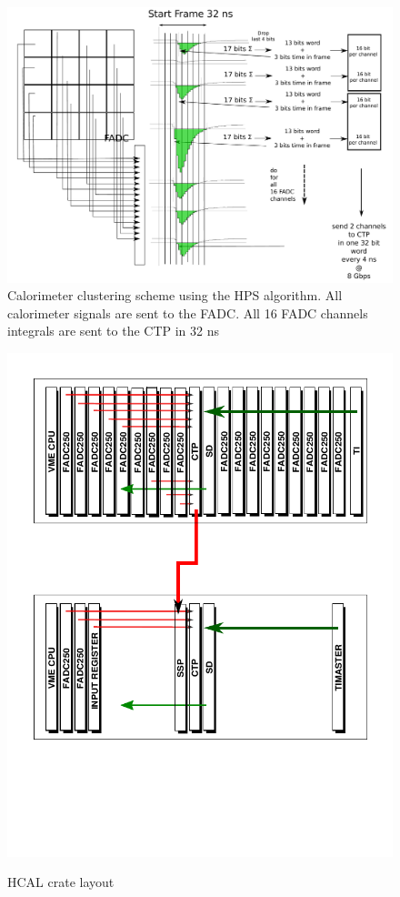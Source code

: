 \documentclass{article}
\begin{document}
\begin{figure}
  \centering
 \includegraphics[width=\textwidth]{figs/CaloTrigger.pdf}
  \caption{Calorimeter clustering scheme using the HPS algorithm. All calorimeter signals are sent to the FADC. All 16 FADC channels integrals are sent to the CTP in 32 ns}\label{fig:ClustHPS}
\end{figure}


\begin{figure}
  \centering
  \includegraphics[width=\textwidth]{figs/VXSHCalFADC.pdf}\\
  \caption{HCAL crate layout }\label{fig:HCALFADC}
\end{figure}
\end{document}
